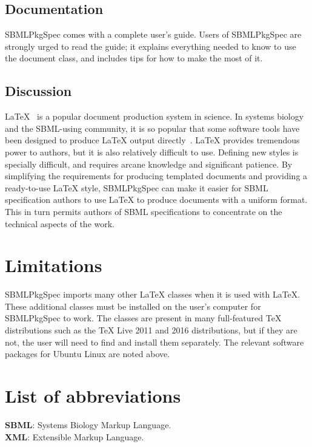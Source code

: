 \documentclass{bmcart}
\newcommand{\sbmlpkg}{SBMLPkgSpec}
\begin{document}
\subsection*{Documentation}

\sbmlpkg{} comes with a complete user's guide.  Users of \sbmlpkg{} are strongly urged to read the guide; it explains everything needed to know to use the document class, and includes tips for how to make the most of it.  


\subsection*{Discussion}

LaTeX~\cite{lamport1994} is a popular document production system in science.  In systems biology and the SBML-using community, it is so popular that some software tools have been designed to produce LaTeX output directly~\cite{drager2009sbml2latex, shen2010sbml2tikz}.  LaTeX provides tremendous power to authors, but it is also relatively difficult to use.  Defining new styles is specially difficult, and requires arcane knowledge and significant patience.  By simplifying the requirements for producing templated documents and providing a ready-to-use LaTeX style, \sbmlpkg{} can make it easier for SBML specification authors to use LaTeX to produce documents with a uniform format.  This in turn permits authors of SBML specifications to concentrate on the technical aspects of the work.


\section*{Limitations}

\sbmlpkg{} imports many other LaTeX classes when it is used with LaTeX. These additional classes must be installed on the user's computer for \sbmlpkg{} to work.  The classes are present in many full-featured TeX distributions such as the TeX Live 2011 and 2016 distributions, but if they are not, the user will need to find and install them separately. The relevant software packages for Ubuntu Linux are noted above.


\section*{List of abbreviations}

\textbf{SBML}: Systems Biology Markup Language.\\
\textbf{XML}: Extensible Markup Language.
\end{document}
